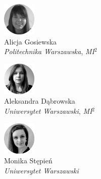 \begin{minipage}[t]{0.33\textwidth}
	\center     
    \includegraphics[width=60px]{img/people/czarno_biale/alicja-crop.png}   \\
    Alicja Gosiewska \\
    \textit{Politechnika Warszawska}, \textit{MI$^{2}$}
\end{minipage}
\begin{minipage}[t]{0.33\textwidth}
	\center 
    \includegraphics[width=60px]{img/people/czarno_biale/aleksandra-crop.png}    \\
    Aleksandra Dąbrowska \\
	\textit{Uniwersytet Warszawski}, \textit{MI$^{2}$}  
\end{minipage}
\begin{minipage}[t]{0.33\textwidth}
	\center     
    \includegraphics[width=60px]{img/people/czarno_biale/monika-crop.png}   \\
    Monika Stępień \\
	\textit{Uniwersytet Warszawski}
\end{minipage}

